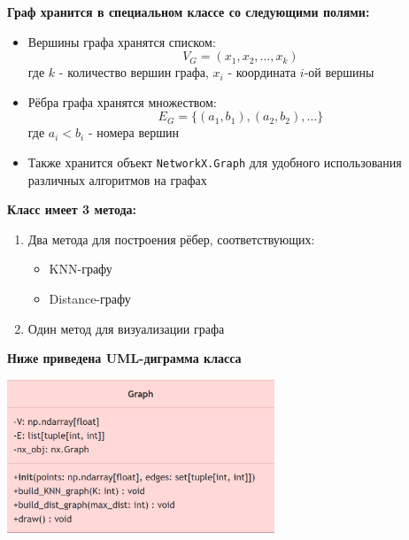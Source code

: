 \textbf{Граф хранится в специальном классе со следующими полями:}

\begin{itemize}
    \item Вершины графа хранятся списком:
    \[ V_G = (x_1, x_2, \ldots, x_k) \]
    где $k$ - количество вершин графа, $x_i$ - координата $i$-ой вершины
    
    \item Рёбра графа хранятся множеством:
    \[ E_G = \{(a_1, b_1), (a_2, b_2), \ldots\} \]
    где $a_i < b_i$ - номера вершин
    
    \item Также хранится объект \texttt{NetworkX.Graph} для удобного использования различных алгоритмов на графах
\end{itemize}

\textbf{Класс имеет 3 метода:}
\begin{enumerate}
    \item Два метода для построения рёбер, соответствующих:
    \begin{itemize}
        \item KNN-графу
        \item Distance-графу
    \end{itemize}
    \item Один метод для визуализации графа
\end{enumerate}


\textbf{Ниже приведена UML-диграмма класса}\\
\begin{center}
    \includegraphics[width=0.6\textwidth]{graphs_implementation/UML graph.png}\\    
\end{center}

